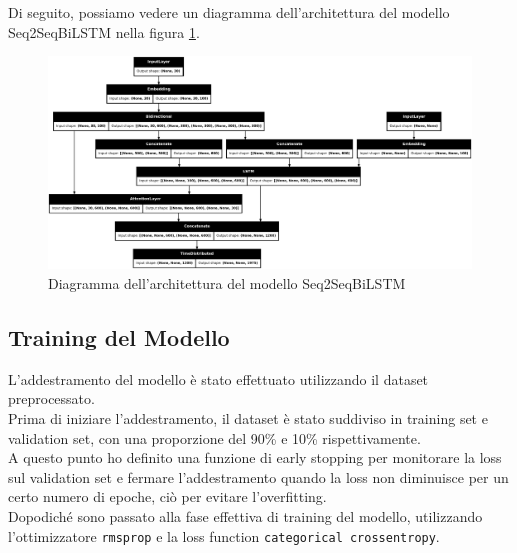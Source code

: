\documentclass[a4paper, 12pt]{article}
\begin{document}
Di seguito, possiamo vedere un diagramma dell'architettura del modello Seq2SeqBiLSTM nella figura \ref{fig:seq2seqbilstm_model_architecture}.

\begin{figure}[H]
    \centering
    \includegraphics[width=1\textwidth]{media/Seq2SeqBiLSTM_image.png}
    \caption{Diagramma dell'architettura del modello Seq2SeqBiLSTM}
    \label{fig:seq2seqbilstm_model_architecture}
\end{figure}


\subsection{Training del Modello}
L'addestramento del modello è stato effettuato utilizzando il dataset preprocessato.\\
Prima di iniziare l'addestramento, il dataset è stato suddiviso in training set e validation set, con una proporzione del 90\% e 10\% rispettivamente.\\
A questo punto ho definito una funzione di early stopping per monitorare la loss sul validation set e fermare l'addestramento quando la loss non diminuisce per un certo numero di epoche, ciò per evitare l'overfitting.\\
Dopodiché sono passato alla fase effettiva di training del modello, utilizzando l'ottimizzatore \texttt{rmsprop} e la loss function \texttt{categorical crossentropy}.\\
\end{document}
